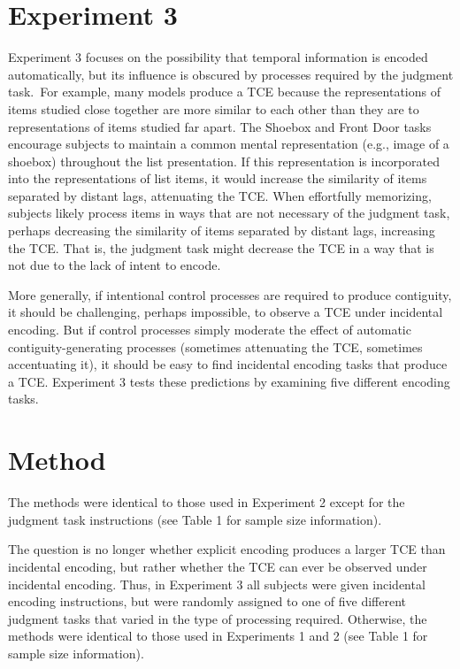 \documentclass[man,natbib,floatsintext]{apa6} %
\begin{document}
\section{Experiment 3}
Experiment 3 focuses on the possibility that temporal information is encoded automatically, but its influence is obscured by processes required by the judgment task.\color{black}~For example, many models produce a TCE because the representations of items studied close together are more similar to each other than they are to representations of items studied far apart. The Shoebox and Front Door tasks encourage subjects to maintain a common mental representation (e.g., image of a shoebox) throughout the list presentation. If this representation is incorporated into the representations of list items, it would increase the similarity of items separated by distant lags, attenuating the TCE. When effortfully memorizing, subjects likely process items in ways that are not necessary of the judgment task, perhaps decreasing the similarity of items separated by distant lags, increasing the TCE. That is, the judgment task might decrease the TCE in a way that is not due to the lack of intent to encode.

More generally, if intentional control processes are required to produce contiguity, it should be challenging, perhaps impossible, to observe a TCE under incidental encoding. But if control processes simply moderate the effect of automatic contiguity-generating processes (sometimes attenuating the TCE, sometimes accentuating it), it should be easy to find incidental encoding tasks that produce a TCE. Experiment 3 tests these predictions by examining five different encoding tasks.

\section{Method}
The methods were identical to those used in Experiment 2 except for the judgment task instructions (see Table 1 for sample size information).

The question is no longer whether explicit encoding produces a larger TCE than incidental encoding, but rather whether the TCE can ever be observed under incidental encoding. Thus, in Experiment 3 all subjects were given incidental encoding instructions, but were randomly assigned to one of five different judgment tasks that varied in the type of processing required. Otherwise, the methods were identical to those used in Experiments 1 and 2 (see Table 1 for sample size information).
\end{document}
